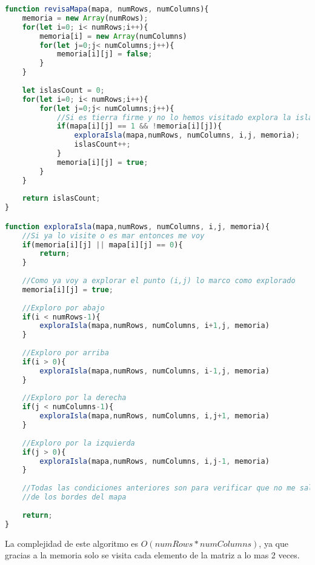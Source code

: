 \begin{lstlisting}[language=JavaScript, caption=Contar islas]
function revisaMapa(mapa, numRows, numColumns){
    memoria = new Array(numRows);
    for(let i=0; i< numRows;i++){
        memoria[i] = new Array(numColumns)
        for(let j=0;j< numColumns;j++){
            memoria[i][j] = false;
        }     
    }
    
    let islasCount = 0;
    for(let i=0; i< numRows;i++){
        for(let j=0;j< numColumns;j++){
            //Si es tierra firme y no lo hemos visitado explora la isla
            if(mapa[i][j] == 1 && !memoria[i][j]){
                exploraIsla(mapa,numRows, numColumns, i,j, memoria);
                islasCount++;
            }
            memoria[i][j] = true;
        }        
    }
    
    return islasCount;
}

function exploraIsla(mapa,numRows, numColumns, i,j, memoria){
    //Si ya lo visite o es mar entonces me voy
    if(memoria[i][j] || mapa[i][j] == 0){
        return;
    }
    
    //Como ya voy a explorar el punto (i,j) lo marco como explorado
    memoria[i][j] = true;
    
    //Exploro por abajo
    if(i < numRows-1){
        exploraIsla(mapa,numRows, numColumns, i+1,j, memoria)
    }
    
    //Exploro por arriba
    if(i > 0){
        exploraIsla(mapa,numRows, numColumns, i-1,j, memoria)
    }
    
    //Exploro por la derecha 
    if(j < numColumns-1){
        exploraIsla(mapa,numRows, numColumns, i,j+1, memoria)
    }
    
    //Exploro por la izquierda
    if(j > 0){
        exploraIsla(mapa,numRows, numColumns, i,j-1, memoria)
    }
    
    //Todas las condiciones anteriores son para verificar que no me salga
    //de los bordes del mapa
    
    return;
}
\end{lstlisting}

 La complejidad de este algoritmo es $O(numRows * numColumns)$, ya que gracias a la memoria solo se visita cada elemento de la matriz a lo mas 2 veces. 